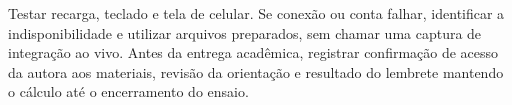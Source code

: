 Testar recarga, teclado e tela de celular. Se conexão ou conta falhar, identificar a indisponibilidade e utilizar arquivos preparados, sem chamar uma captura de integração ao vivo. Antes da entrega acadêmica, registrar confirmação de acesso da autora aos materiais, revisão da orientação e resultado do lembrete mantendo o cálculo até o encerramento do ensaio.
